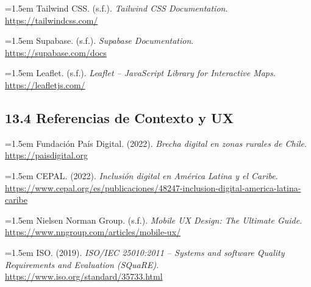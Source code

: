 \documentclass[12pt]{article}
\begin{document}
\hangindent=1.5em
Tailwind CSS. (s.f.). \textit{Tailwind CSS Documentation}.\\
\url{https://tailwindcss.com/}

\hangindent=1.5em
Supabase. (s.f.). \textit{Supabase Documentation}.\\
\url{https://supabase.com/docs}

\hangindent=1.5em
Leaflet. (s.f.). \textit{Leaflet – JavaScript Library for Interactive Maps}.\\
\url{https://leafletjs.com/}

\vspace{1.5em}
\subsection{13.4 \hspace{0.5em} Referencias de Contexto y UX}
\hangindent=1.5em
Fundación País Digital. (2022). \textit{Brecha digital en zonas rurales de Chile}.\\
\url{https://paisdigital.org}

\hangindent=1.5em
CEPAL. (2022). \textit{Inclusión digital en América Latina y el Caribe}.\\
\url{https://www.cepal.org/es/publicaciones/48247-inclusion-digital-america-latina-caribe}

\hangindent=1.5em
Nielsen Norman Group. (s.f.). \textit{Mobile UX Design: The Ultimate Guide}.\\
\url{https://www.nngroup.com/articles/mobile-ux/}

\hangindent=1.5em
ISO. (2019). \textit{ISO/IEC 25010:2011 – Systems and software Quality Requirements and Evaluation (SQuaRE)}.\\
\url{https://www.iso.org/standard/35733.html}
\end{document}
